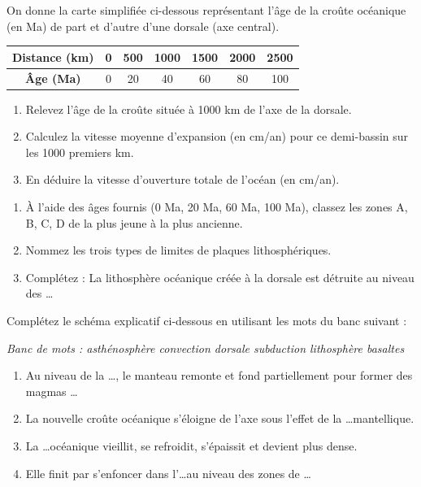 \documentclass[11pt]{article}
\begin{document}
\begin{exercice}
On donne la carte simplifiée ci-dessous représentant l'âge de la croûte océanique (en Ma) de part et d'autre d'une dorsale (axe central).
\begin{center}
\begin{tabular}{|c|c|c|c|c|c|c|}
\hline
\textbf{Distance (km)} & 0 & 500 & 1000 & 1500 & 2000 & 2500 \\
\hline
\textbf{Âge (Ma)} & 0 & 20 & 40 & 60 & 80 & 100 \\
\hline
\end{tabular}
\end{center}
\begin{enumerate}
    \item Relevez l'âge de la croûte située à 1000 km de l'axe de la dorsale.
    \item Calculez la vitesse moyenne d'expansion (en cm/an) pour ce demi-bassin sur les 1000 premiers km.
    \item En déduire la vitesse d'ouverture totale de l'océan (en cm/an).
\end{enumerate}
\end{exercice}

\begin{exercice}
\begin{enumerate}
    \item À l'aide des âges fournis (0 Ma, 20 Ma, 60 Ma, 100 Ma), classez les zones A, B, C, D de la plus jeune à la plus ancienne.
    \item Nommez les trois types de limites de plaques lithosphériques.
    \item Complétez : La lithosphère océanique créée à la dorsale est détruite au niveau des \ldots
\end{enumerate}
\end{exercice}

\begin{exercice}
Complétez le schéma explicatif ci-dessous en utilisant les mots du banc suivant :
\begin{center}
\textit{Banc de mots : \quad asthénosphère \quad convection \quad dorsale \quad subduction \quad lithosphère \quad basaltes}
\end{center}
\begin{enumerate}
    \item Au niveau de la \ldots, le manteau remonte et fond partiellement pour former des magmas \ldots
    \item La nouvelle croûte océanique s'éloigne de l'axe sous l'effet de la \ldots mantellique.
    \item La \ldots océanique vieillit, se refroidit, s'épaissit et devient plus dense.
    \item Elle finit par s'enfoncer dans l'\ldots au niveau des zones de \ldots
\end{enumerate}
\end{exercice}
\end{document}
